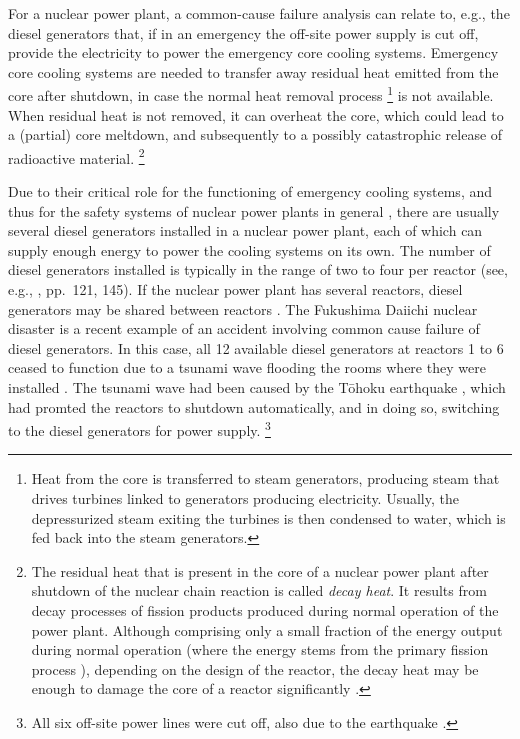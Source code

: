 For a nuclear power plant, a common-cause failure analysis can relate to, e.g.,
the diesel generators that, if in an emergency the off-site power supply is cut off,
provide the electricity to power the emergency core cooling systems.
Emergency core cooling systems are needed to transfer away residual heat emitted from the core after shutdown,
in case the normal heat removal process%
\footnote{Heat from the core is transferred to steam generators,
producing steam that drives turbines linked to generators producing electricity.
Usually, the depressurized steam exiting the turbines
is then condensed to water, which is fed back into the steam generators.}
is not available.
When residual heat is not removed, it can overheat the core,
which could lead to a (partial) core meltdown,
and subsequently to a possibly catastrophic release of radioactive material.%
\footnote{The residual heat that is present in the core of a nuclear power plant
after shutdown of the nuclear chain reaction is called \emph{decay heat}.
It results from decay processes of fission products produced during normal operation of the power plant.
Although comprising only a small fraction of the energy output during normal operation
(where the energy stems from the primary fission process \parencite[Module~4, p.~33]{united1993doe}),
depending on the design of the reactor,
the decay heat may be enough to damage the core of a reactor significantly
\parencite[p.~VIII-9 and VIII-25f]{1975:reactor:safety:study}.}

Due to their critical role for the functioning of emergency cooling systems,
and thus for the safety systems of nuclear power plants in general \parencite[pp.~1, 4]{csni86-115},
there are usually several diesel generators installed in a nuclear power plant,
each of which can supply enough energy to power the cooling systems on its own.
The number of diesel generators installed is typically in the range of two to four per reactor
(see, e.g., \textcite{csni86-115}, pp.~121, 145).
If the nuclear power plant has several reactors, diesel generators may be shared between reactors \parencite[p.~7]{2004:iaea::emergencypower}.
The Fukushima Daiichi nuclear disaster is a recent example of an accident
involving common cause failure of diesel generators.
In this case, all 12 available diesel generators at reactors 1 to 6 
ceased to function due to a tsunami wave flooding the rooms where they were installed \parencite[p.~31]{2011:iaea::report}.
The tsunami wave had been caused by the T\={o}hoku earthquake \parencite{2012:ritsema},
which had promted the reactors to shutdown automatically, and in doing so,
switching to the diesel generators for power supply.%
\footnote{All six off-site power lines were cut off, also due to the earthquake \parencite[p.~31]{2011:iaea::report}.}

